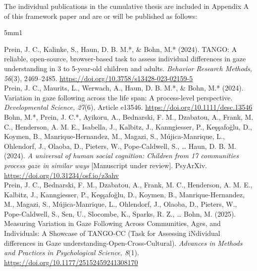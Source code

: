 \documentclass[
]{scrbook}
\begin{document}
\begin{titlepage}
\begin{flushleft}
\begin{normalsize}
                The individual publications in the cumulative thesis are included in Appendix A of this framework paper and are or will be published as follows: \\[5mm]
                
                \begin{hangparas}{5mm}{1}

Prein, J. C., Kalinke, S., Haun, D. B. M.*, \& Bohn, M.* (2024). TANGO: A reliable, open-source, browser-based task to assess individual differences in gaze understanding in 3 to 5-year-old children and adults. \textit{Behavior Research Methods, 56}(3), 2469–2485. \mbox{\url{https://doi.org/10.3758/s13428-023-02159-5}} \\[5mm]

Prein, J. C., Maurits, L., Werwach, A., Haun, D. B. M.*, \& Bohn, M.* (2024). Variation in gaze following across the life span: A process-level perspective. \textit{Developmental Science, 27}(6), Article e13546. \mbox{\url{https://doi.org/10.1111/desc.13546}} \\[5mm]

Bohn, M.*, Prein, J. C.*, Ayikoru, A., Bednarski, F. M., Dzabatou, A., Frank, M. C., Henderson, A. M. E., Isabella, J., Kalbitz, J., Kanngiesser, P., Keşşafoğlu, D., Koymen, B., Manrique-Hernandez, M., Magazi, S., Mújica-Manrique, L., Ohlendorf, J., Olaoba, D., Pieters, W., Pope-Caldwell, S., … Haun, D. B. M.(2024). \textit{A universal of human social cognition: Children from 17 communities process gaze in similar ways} [Manuscript under review]. PsyArXiv. \mbox{\url{https://doi.org/10.31234/osf.io/z3ahv}} \\[5mm]

Prein, J. C., Bednarski, F. M., Dzabatou, A., Frank, M. C., Henderson, A. M. E., Kalbitz, J., Kanngiesser, P., Keşşafoğlu, D., Koymen, B., Manrique-Hernandez, M., Magazi, S., Mújica-Manrique, L., Ohlendorf, J., Olaoba, D., Pieters, W., Pope-Caldwell, S., Sen, U., Slocombe, K., Sparks, R. Z., … Bohn, M. (2025). Measuring Variation in Gaze Following Across Communities, Ages, and Individuals: A Showcase of TANGO-CC (Task for Assessing iNdividual differences in Gaze understanding-Open-Cross-Cultural). \textit{Advances in Methods and Practices in Psychological Science, 8}(1). \mbox{\url{https://doi.org/10.1177/25152459241308170}}\\[10mm]

                \end{hangparas}
                
        \end{normalsize}
    \end{flushleft}
    
\end{titlepage}
\end{document}
